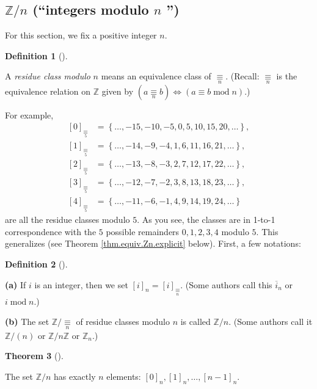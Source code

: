 \documentclass[numbers=enddot,12pt,final,onecolumn,notitlepage]{scrartcl}%
\numberwithin{exer}{subsection}
\theoremstyle{definition}
\newtheorem{theo}{Theorem}[subsection]
\newenvironment{theorem}[1][]
{\begin{theo}[#1]\begin{leftbar}}
{\end{leftbar}\end{theo}}
\newtheorem{defi}[theo]{Definition}
\newenvironment{definition}[1][]
{\begin{defi}[#1]\begin{leftbar}}
{\end{leftbar}\end{defi}}
\begin{document}
\subsection{$\mathbb{Z}/n$ (\textquotedblleft integers modulo $n$%
\textquotedblright)}

For this section, we fix a positive integer $n$.

\begin{definition}
A \textit{residue class modulo}\textbf{ }$n$ means an equivalence class of
$\underset{n}{\equiv}$. (Recall: $\underset{n}{\equiv}$ is the equivalence
relation on $\mathbb{Z}$ given by $\left(  a\underset{n}{\equiv}b\right)
\Longleftrightarrow\left(  a\equiv b\operatorname{mod}n\right)  $.)
\end{definition}

For example,%
\begin{align*}
\left[  0\right]  _{\underset{5}{\equiv}}  &  =\left\{  \ldots
,-15,-10,-5,0,5,10,15,20,\ldots\right\}  ,\\
\left[  1\right]  _{\underset{5}{\equiv}}  &  =\left\{  \ldots
,-14,-9,-4,1,6,11,16,21,\ldots\right\}  ,\\
\left[  2\right]  _{\underset{5}{\equiv}}  &  =\left\{  \ldots
,-13,-8,-3,2,7,12,17,22,\ldots\right\}  ,\\
\left[  3\right]  _{\underset{5}{\equiv}}  &  =\left\{  \ldots
,-12,-7,-2,3,8,13,18,23,\ldots\right\}  ,\\
\left[  4\right]  _{\underset{5}{\equiv}}  &  =\left\{  \ldots
,-11,-6,-1,4,9,14,19,24,\ldots\right\}
\end{align*}
are all the residue classes modulo $5$. As you see, the classes are in 1-to-1
correspondence with the $5$ possible remainders $0,1,2,3,4$ modulo $5$. This
generalizes (see Theorem \ref{thm.equiv.Zn.explicit} below). First, a few notations:

\begin{definition}
\textbf{(a)} If $i$ is an integer, then we set $\left[  i\right]  _{n}=\left[
i\right]  _{\underset{n}{\equiv}}$. (Some authors call this $\overline{i}_{n}$
or $i\operatorname{mod}n$.)

\textbf{(b)} The set $\mathbb{Z}/\underset{n}{\equiv}$ of residue classes
modulo $n$ is called $\mathbb{Z}/n$. (Some authors call it $\mathbb{Z}/\left(
n\right)  $ or $\mathbb{Z}/n\mathbb{Z}$ or $\mathbb{Z}_{n}$.)
\end{definition}

\begin{theorem}
\label{thm.equiv.Zn.explicit}The set $\mathbb{Z}/n$ has exactly $n$ elements:
$\left[  0\right]  _{n},\left[  1\right]  _{n},\ldots,\left[  n-1\right]
_{n}$.
\end{theorem}
\end{document}
